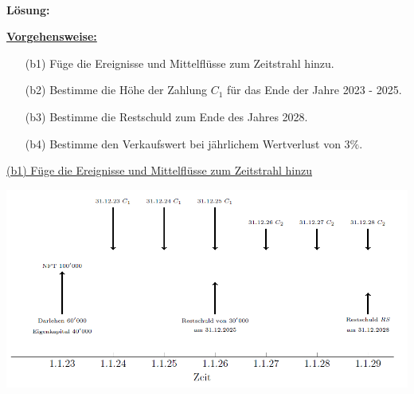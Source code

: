 \ \\
\textbf{Lösung:}
\begin{mdframed}
\underline{\textbf{Vorgehensweise:}}
\begin{enumerate}
\item[(b1)] Füge die Ereignisse und Mittelflüsse zum Zeitstrahl hinzu.
\item[(b2)] Bestimme die Höhe der Zahlung $C_1$ für das Ende der Jahre 2023 - 2025.
\item[(b3)] Bestimme die Restschuld zum Ende des Jahres 2028.
\item[(b4)] Bestimme den Verkaufswert bei jährlichem Wertverlust von $3 \%$.
\end{enumerate}
\end{mdframed}

\newpage
\underline{(b1) Füge die Ereignisse und Mittelflüsse zum Zeitstrahl hinzu}\\
\begin{center}
	\includegraphics[scale=0.65]{pictures/zeitstrahl_1_b_filled_1}
\end{center}

